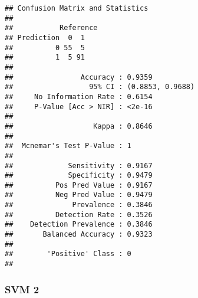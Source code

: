 \documentclass[
]{article}
\newenvironment{Shaded}{\begin{snugshade}}{\end{snugshade}}
\newcommand{\AttributeTok}[1]{\textcolor[rgb]{0.77,0.63,0.00}{#1}}
\newcommand{\FunctionTok}[1]{\textcolor[rgb]{0.00,0.00,0.00}{#1}}
\newcommand{\NormalTok}[1]{#1}
\newcommand{\OtherTok}[1]{\textcolor[rgb]{0.56,0.35,0.01}{#1}}
\newcommand{\SpecialCharTok}[1]{\textcolor[rgb]{0.00,0.00,0.00}{#1}}
\newcommand{\StringTok}[1]{\textcolor[rgb]{0.31,0.60,0.02}{#1}}
\begin{document}
\begin{Shaded}
\end{Shaded}

\begin{verbatim}
## Confusion Matrix and Statistics
## 
##           Reference
## Prediction  0  1
##          0 55  5
##          1  5 91
##                                           
##                Accuracy : 0.9359          
##                  95% CI : (0.8853, 0.9688)
##     No Information Rate : 0.6154          
##     P-Value [Acc > NIR] : <2e-16          
##                                           
##                   Kappa : 0.8646          
##                                           
##  Mcnemar's Test P-Value : 1               
##                                           
##             Sensitivity : 0.9167          
##             Specificity : 0.9479          
##          Pos Pred Value : 0.9167          
##          Neg Pred Value : 0.9479          
##              Prevalence : 0.3846          
##          Detection Rate : 0.3526          
##    Detection Prevalence : 0.3846          
##       Balanced Accuracy : 0.9323          
##                                           
##        'Positive' Class : 0               
## 
\end{verbatim}

\hypertarget{svm-2}{%
\subsubsection{SVM 2}\label{svm-2}}

\begin{Shaded}
\end{Shaded}
\end{document}
